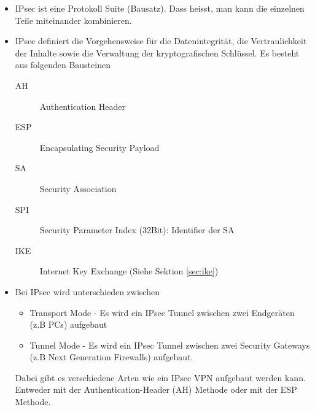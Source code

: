 \begin{itemize}
	\item IPsec ist eine Protokoll Suite (Bausatz). Dass heisst, man kann die einzelnen Teile miteinander kombinieren.
	\item IPsec definiert die Vorgehensweise für die Datenintegrität, die Vertraulichkeit der Inhalte sowie die Verwaltung der kryptografischen Schlüssel. Es besteht aus folgenden Bausteinen
	\begin{description}
		\item[AH] Authentication Header
		\item[ESP] Encapsulating Security Payload
		\item[SA] Security Association
		\item[SPI] Security Parameter Index (32Bit): Identifier der SA
		\item[IKE] Internet Key Exchange (Siehe Sektion \ref{sec:ike})
	\end{description}
	\item Bei IPsec wird unterschieden zwischen
	\begin{itemize}
	    \item Transport Mode - Es wird ein IPsec Tunnel zwischen zwei Endgeräten (z.B PCs) aufgebaut
	    \item Tunnel Mode - Es wird ein IPsec Tunnel zwischen zwei Security Gateways (z.B Next Generation Firewalls) aufgebaut.
	\end{itemize}
	Dabei gibt es verschiedene Arten wie ein IPsec VPN aufgebaut werden kann. Entweder mit der Authentication-Header (AH) Methode oder mit der ESP Methode.
	

\end{itemize}
